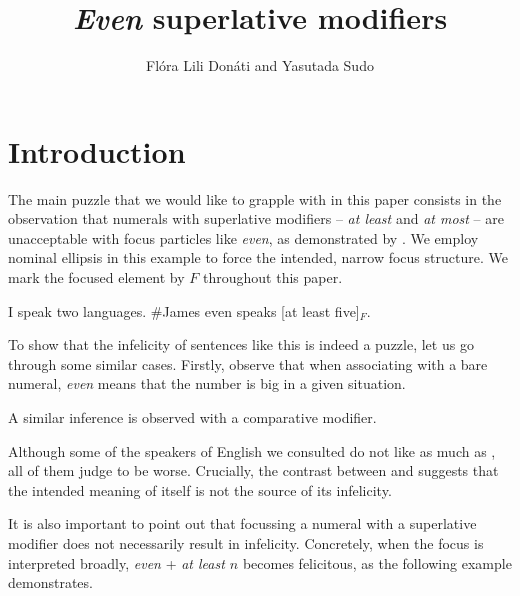 \documentclass[output=paper]{langscibook}
\author{Flóra Lili Donáti\affiliation{SFL, Université Paris 8} and
Yasutada Sudo\affiliation{University College London}}
\title[\textup{Even} superlative modifiers]{\textit{Even} superlative modifiers}
\begin{document}
\maketitle



\section{Introduction}

The main puzzle that we would like to grapple with in this paper consists in the observation that numerals with superlative modifiers -- \textit{at least} and \textit{at most} -- are unacceptable with focus particles like \textit{even}, as demonstrated by . We employ nominal ellipsis in this example to force the intended, narrow focus structure. We mark the focused element by $F$ throughout this paper.

    \ea
    I speak two languages.
    \#James even speaks [at least five]$_F$.\label{don-sud:langs}
    \z

\noindent To show that the infelicity of sentences like this is indeed a puzzle, let us go through some similar cases. Firstly, observe that when associating with a bare numeral, \textit{even} means that the number is big in a given situation. 

    \z
  
\noindent A similar inference is observed with a comparative modifier.

    \z
   
\noindent Although some of the speakers of English we consulted do not like  as much as , all of them judge  to be worse. Crucially, the contrast between  and  suggests that the intended meaning of  itself is not the source of its infelicity.

    It is also important to point out that focussing a numeral with a superlative modifier does not necessarily result in infelicity. Concretely, when the focus is interpreted broadly, \textit{even} + \textit{at least $n$} becomes felicitous, as the following example demonstrates.
\end{document}
